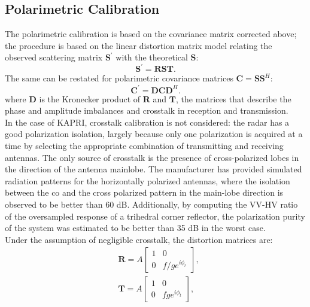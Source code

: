 \subsection{Polarimetric Calibration}\label{sec:methods:proc_polcal}
The polarimetric calibration is based on the covariance matrix corrected above;
the procedure is based on the linear distortion matrix model\cite{Saraband1990, Sarabandi1992a} relating the observed scattering matrix $\mathbf{S}^\prime$ with the theoretical $\mathbf{S}$:
\begin{equation}\label{eq:distorsion_scattering}
	\mathbf{S}^\prime = \mathbf{R} \mathbf{S} \mathbf{T}.
\end{equation}
The same can be restated for polarimetric covariance matrices $\mathbf{C} = \mathbf{S}\mathbf{S}^H$:
\begin{equation}\label{eq:covariance_distortion}
	\mathbf{C}^\prime = \mathbf{D} \mathbf{C} \mathbf{D}^{H}.
\end{equation}
where $\mathbf{D}$ is the Kronecker product of $\mathbf{R}$ and $\mathbf{T}$, the matrices that describe the phase and amplitude imbalances and crosstalk in reception and transmission.\\
In the case of KAPRI, crosstalk calibration is not considered: the radar has a good polarization isolation, largely because only one polarization is acquired at a time by selecting the appropriate combination of transmitting and receiving antennas. The only source of crosstalk is the presence of cross-polarized lobes in the direction of the antenna mainlobe. The manufacturer has provided simulated radiation patterns for the horizontally polarized antennas, where the isolation between the co and the cross polarized pattern in the main-lobe direction is observed to be better than 60 dB. Additionally, by computing the VV-HV ratio of the oversampled response of a trihedral corner reflector, the polarization purity of the system was estimated to be better than 35 dB in the worst case.\\
Under the assumption of negligible crosstalk, the distortion matrices are:
\begin{equation}
	\begin{aligned}
	&\mathbf{R} = A \begin{bmatrix}
		1 & 0\\
		0 & f/g e^{i\phi_{r}}
	\end{bmatrix},\\
	&\mathbf{T} = A \begin{bmatrix}
			1 & 0\\
			0 & f g e^{i\phi_{t}}
		\end{bmatrix},
	\end{aligned}
\end{equation}
